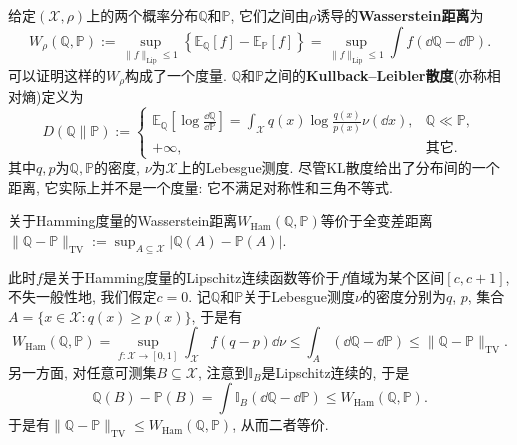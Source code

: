 给定$(\mathcal{X}, \rho)$上的两个概率分布$\mathbb{Q}$和$\mathbb{P}$, 它们之间由$\rho$诱导的\textbf{Wasserstein距离}为
\begin{equation*}
	W_{\rho}(\mathbb{Q}, \mathbb{P}) 
	:= \sup_{\|f\|_{\text{Lip}} \leq 1} \left\{ \mathbb{E}_{\mathbb{Q}} [f] - \mathbb{E}_{\mathbb{P}} [f] \right\}
	= \sup_{\|f\|_{\text{Lip}} \leq 1} \int f (\dd \mathbb{Q} - \dd \mathbb{P}). 
\end{equation*}
可以证明这样的$W_{\rho}$构成了一个度量. 
 $\mathbb{Q}$和$\mathbb{P}$之间的\textbf{Kullback–Leibler散度}(亦称相对熵)定义为
\begin{equation}
	D(\mathbb{Q} \| \mathbb{P})
	:= \begin{cases}
		\mathbb{E}_{\mathbb{Q}} \left[ \log \frac{\dd \mathbb{Q}}{\dd \mathbb{P}} \right]
		= \int_{\mathcal{X}} q(x) \log \frac{q(x)}{p(x)} \nu(\dd x), & \mathbb{Q} \ll \mathbb{P}, \\
		+\infty, &\text{其它}. 
	\end{cases} 
\end{equation}
其中$q, p$为$\mathbb{Q}, \mathbb{P}$的密度, $\nu$为$\mathcal{X}$上的Lebesgue测度. 
尽管KL散度给出了分布间的一个距离, 它实际上并不是一个度量: 它不满足对称性和三角不等式. 

\begin{example}[Hamming度量和全变差距离]
	关于Hamming度量的Wasserstein距离$W_{\text{Ham}}(\mathbb{Q}, \mathbb{P})$等价于全变差距离$\|\mathbb{Q} - \mathbb{P}\|_{\text{TV}} := \sup_{A \subseteq \mathcal{X}} |\mathbb{Q}(A) - \mathbb{P}(A)|$. 
	
	此时$f$是关于Hamming度量的Lipschitz连续函数等价于$f$值域为某个区间$[c, c+1]$, 不失一般性地, 我们假定$c = 0$. 
	记$\mathbb{Q}$和$\mathbb{P}$关于Lebesgue测度$\nu$的密度分别为$q$, $p$, 集合$A = \{x \in \mathcal{X} \colon q(x) \geq p(x)\} $, 于是有
	\begin{equation*}
		W_{\text{Ham}}(\mathbb{Q}, \mathbb{P})
		= \sup_{f \colon \mathcal{X} \to [0, 1]} \int_{\mathcal{X}} f (q - p) \dd \nu 
		\leq \int_A (\dd \mathbb{Q} - \dd \mathbb{P})
		\leq \|\mathbb{Q} - \mathbb{P}\|_{\text{TV}}. 
	\end{equation*}
	另一方面, 对任意可测集$B \subseteq \mathcal{X}$, 注意到$\mathbb{I}_B$是Lipschitz连续的, 于是
	\begin{equation*}
		\mathbb{Q}(B) - \mathbb{P}(B) 
		= \int \mathbb{I}_B (\dd \mathbb{Q} - \dd \mathbb{P}) 
		\leq W_{\text{Ham}}(\mathbb{Q}, \mathbb{P}). 
	\end{equation*}
	于是有$\|\mathbb{Q} - \mathbb{P}\|_{\text{TV}} \leq W_{\text{Ham}}(\mathbb{Q}, \mathbb{P})$, 从而二者等价. 
\end{example}

